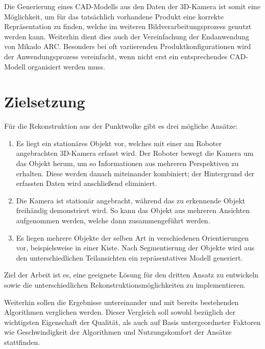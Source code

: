 Die Generierung eines CAD-Modells aus den Daten der 3D-Kamera ist somit eine Möglichkeit, um für das tatsächlich vorhandene Produkt eine korrekte Repräsentation zu finden, welche im weiteren Bildverarbeitungsprozess genutzt werden kann.
Weiterhin dient dies auch der Vereinfachung der Endanwendung von Mikado ARC.
Besonders bei oft variierenden Produktkonfigurationen wird der Anwendungsprozess vereinfacht, wenn nicht erst ein entsprechendes CAD-Modell organisiert werden muss.


\section{Zielsetzung}
\label{sec:ziel}

Für die Rekonstruktion aus der Punktwolke gibt es drei mögliche Ansätze:

\begin{enumerate}
\item Es liegt ein stationäres Objekt vor, welches mit einer am Roboter angebrachten 3D-Kamera erfasst wird.
Der Roboter bewegt die Kamera um das Objekt herum, um so Informationen aus mehreren Perspektiven zu erhalten.
Diese werden danach miteinander kombiniert; der Hintergrund der erfassten Daten wird anschließend eliminiert.

\item Die Kamera ist stationär angebracht, während das zu erkennende Objekt freihändig demonstriert wird.
So kann das Objekt aus mehreren Ansichten aufgenommen werden, welche dann zusammengeführt werden.

\item Es liegen mehrere Objekte der selben Art in verschiedenen Orientierungen vor, beispielsweise in einer Kiste.
Nach Segmentierung der Objekte wird aus den unterschiedlichen Teilansichten ein repräsentatives Modell generiert.
\end{enumerate}


Ziel der Arbeit ist es, eine geeignete Lösung für den dritten Ansatz zu entwickeln sowie die unterschiedlichen Rekonstruktionsmöglichkeiten zu implementieren.

Weiterhin sollen die Ergebnisse untereinander und mit bereits bestehenden Algorithmen verglichen werden.
Dieser Vergleich soll sowohl bezüglich der wichtigsten Eigenschaft der Qualität, als auch auf Basis untergeordneter Faktoren wie Geschwindigkeit der Algorithmen und Nutzungskomfort der Ansätze stattfinden.
